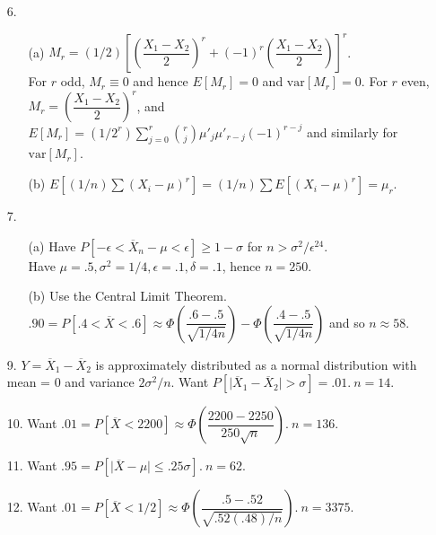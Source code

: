 \begin{enumerate}
	\item[6.]  \begin{enumerate}
		\item[(a)] $M_r = (1/2)\left[\left(\dfrac{X_1-X_2}{2}\right)^r + (-1)^r\left(\dfrac{X_1-X_2}{2}\right)\right]^r$. \\
		For $r$ odd, $M_r \equiv 0$ and hence $E[M_r]=0$ and $\mbox{var}[M_r]=0$. For $r$ even, $M_r = \left(\dfrac{X_1-X_2}{2}\right)^r$, and $E[M_r] = (1/2^r)\sum\limits_{j=0}^r{r\choose j}\mu'_j\mu'_{r-j}(-1)^{r-j}$ and similarly for $\mbox{var}[M_r]$.
		\item[(b)] $E[(1/n)\sum(X_i-\mu)^r] = (1/n)\sum E[(X_i-\mu)^r] = \mu_r$.
	\end{enumerate}

	\item[7.]  \begin{enumerate}
		\item[(a)] Have $P[-\epsilon < \overline{X}_n - \mu < \epsilon] \ge 1 - \sigma$ for $n > \sigma^2/\epsilon^24.$ \\
		Have $\mu = .5, \sigma^2=1/4, \epsilon=.1, \delta=.1$, hence $n=250$.
		\item[(b)] Use the Central Limit Theorem. \\
		$.90 = P[.4 < \overline{X}<.6] \approx \Phi\left(\dfrac{.6-.5}{\sqrt{1/4n}}\right) - \Phi\left(\dfrac{.4-.5}{\sqrt{1/4n}}\right)$ and so $n \approx 58$. 
	\end{enumerate}

	\newpage
	
	\item[9.] $Y=\overline{X}_1-\overline{X}_2$ is approximately distributed as a normal distribution with mean = 0 and variance $2\sigma^2/n$. Want $P[\vert\overline{X}_1-\overline{X}_2\vert>\sigma] = .01.\ n = 14$.
	
	\item[10.] Want $.01 = P[\overline{X}<2200] \approx \Phi\left(\dfrac{2200-2250}{250\sqrt{n}}\right)\!.\ n =136$.
	
	\item[11.] Want $.95 = P[\vert\overline{X}-\mu\vert\le .25\sigma].\ n =62$.
		
	\item[12.] Want $.01 = P[\overline{X}<1/2]\approx \Phi\left(\dfrac{.5-.52}{\sqrt{.52(.48)/n}}\right)\!.\ n = 3375$.
	

\end{enumerate}
